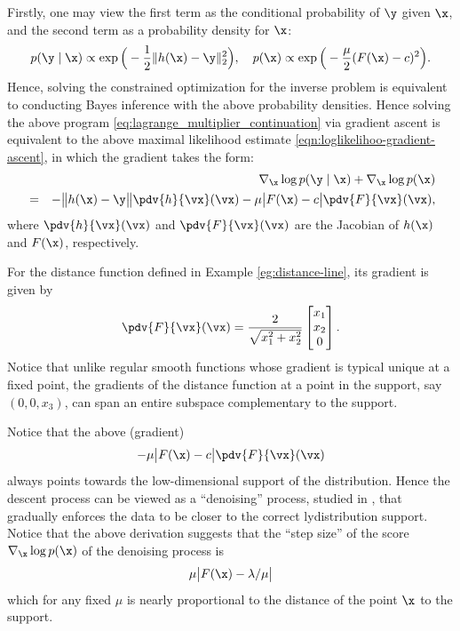 \documentclass[../../book-main.tex]{subfiles}
\begin{document}
Firstly, one may view the first term as the conditional probability of $\y$ given $\x$, and the second term as a probability density for $\x$:
\begin{equation}
  p(\y\mid \x) \propto \exp\Big(- \frac{1}{2}\|h(\x) - \y\|_2^2\Big), \quad 
    p(\x) \propto \exp\Big( - \frac{\mu}{2}(F(\x) - c)^2\Big).
\end{equation} 
Hence, solving the constrained optimization for the inverse problem is equivalent to conducting Bayes inference with the above probability densities. Hence solving the above program \eqref{eq:lagrange_multiplier_continuation} via gradient ascent is equivalent to the above maximal likelihood estimate \eqref{eqn:loglikelihoo-gradient-ascent}, 
in which the gradient  takes the form:
\begin{eqnarray}
   && \nabla_{\x} \log p(\y \mid \x) + \nabla_{\x} \log p(\x)  \\
   &=&  - \big\|h(\x) - \y\big\| \pdv{h}{\vx}(\vx) -  \mu \big| F(\x) - c \big| \pdv{F}{\vx}(\vx), \label{eqn:EngMin-gradient}
\end{eqnarray}
where $\pdv{h}{\vx}(\vx)$ and $\pdv{F}{\vx}(\vx)$ are the Jacobian of $h(\x)$ and $F(\x)$, respectively. 
\begin{example}[Gradient of $F(\x)$] For the distance function defined in Example \ref{eg:distance-line}, its gradient is given by
\begin{equation}
\pdv{F}{\vx}(\vx) =  \frac{2}{\sqrt{x_1^2 + x_2^2}}\left[\begin{matrix}
x_1 \\ x_2 \\ 0   
\end{matrix}\right].  
\end{equation}
Notice that unlike regular smooth functions whose gradient is typical unique at a fixed point, the gradients of the distance function at a point in the support, say $(0, 0, x_3)$, can span an entire subspace complementary to the support. 
\end{example}


Notice that the above (gradient) 
$$-  \mu \big| F(\x) - c \big| \pdv{F}{\vx}(\vx)$$ always points towards the low-dimensional support of the distribution. Hence the descent process can be viewed as a ``denoising'' process, studied in  , that gradually enforces the data  to be closer to the correct lydistribution support. Notice that the above derivation suggests that the ``step size'' of the score $\nabla_{\x} \log p(\x)$ of the denoising process is $$\mu \big| F(\x) - \lambda/\mu\big|$$ which for any fixed $\mu$ is nearly proportional to the distance of the point $\x$ to the support.
\end{document}
